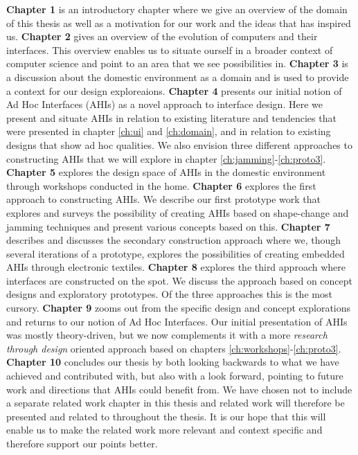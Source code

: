 
\textbf{Chapter 1} is an introductory chapter where we give an overview of the domain of this thesis as well as a motivation for our work and the ideas that has inspired us.
\blank
\textbf{Chapter 2} gives an overview of the evolution of computers and their interfaces.
This overview enables us to situate ourself in a broader context of computer science and point to an area that we see possibilities in.  
\blank
\textbf{Chapter 3} is a discussion about the domestic environment as a domain and is used to provide a context for our design exploreaions. 
\blank
\textbf{Chapter 4} presents our initial notion of Ad Hoc Interfaces (AHIs) as a novel approach to interface design.
Here we present and situate AHIs in relation to existing literature and tendencies that were presented in chapter \ref{ch:ui} and \ref{ch:domain}, and in relation to existing designs that show ad hoc qualities.
We also envision three different approaches to constructing AHIs that we will explore in chapter \ref{ch:jamming}-\ref{ch:proto3}.
\blank
\textbf{Chapter 5} explores the design space of AHIs in the domestic environment through workshops conducted in the home.
\blank
\textbf{Chapter 6} explores the first approach to constructing AHIs. 
We describe our first prototype work that explores and surveys the possibility of creating AHIs based on shape-change and jamming techniques and present various concepts based on this.
\blank
\textbf{Chapter 7} describes and discusses the secondary construction approach where we, though several iterations of a prototype, explores the possibilities of creating embedded AHIs through electronic textiles.
\blank
\textbf{Chapter 8} explores the third approach where interfaces are constructed on the spot.
We discuss the approach based on concept designs and exploratory prototypes. 
Of the three approaches this is the most cursory.
\blank
\textbf{Chapter 9} zooms out from the specific design and concept explorations and returns to our notion of Ad Hoc Interfaces.
Our initial presentation of AHIs was mostly theory-driven, but we now complements it with a more \emph{research through design} oriented approach based on chapters \ref{ch:workshops}-\ref{ch:proto3}. 
\blank
\textbf{Chapter 10} concludes our thesis by both looking backwards to what we have achieved and contributed with, but also with a look forward, pointing to future work and directions that AHIs could benefit from.
\blank
We have chosen not to include a separate related work chapter in this thesis and related work will therefore be presented and related to throughout the thesis.
It is our hope that this will enable us to make the related work more relevant and context specific and therefore support our points better. 